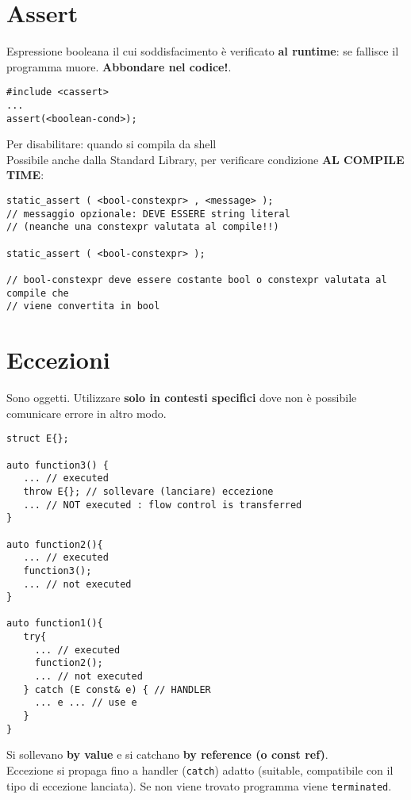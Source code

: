 \documentclass[10pt, oneside]{Book}
\begin{document}
\section{Assert}
Espressione booleana il cui soddisfacimento è verificato \textbf{al runtime}: se fallisce il programma muore. \textbf{Abbondare nel codice!}.
\begin{verbatim}
#include <cassert>
...
assert(<boolean-cond>);
\end{verbatim}
Per disabilitare: quando si compila da shell 
\\Possibile anche dalla Standard Library, per verificare condizione \textbf{AL COMPILE TIME}:
\begin{verbatim}
static_assert ( <bool-constexpr> , <message> );
// messaggio opzionale: DEVE ESSERE string literal
// (neanche una constexpr valutata al compile!!)

static_assert ( <bool-constexpr> );

// bool-constexpr deve essere costante bool o constexpr valutata al compile che
// viene convertita in bool
\end{verbatim}

\section{Eccezioni}
Sono oggetti. Utilizzare \textbf{solo in contesti specifici} dove non è possibile comunicare errore in altro modo.
\begin{verbatim}
struct E{};

auto function3() {
   ... // executed
   throw E{}; // sollevare (lanciare) eccezione
   ... // NOT executed : flow control is transferred
}

auto function2(){
   ... // executed
   function3();
   ... // not executed
}

auto function1(){
   try{
     ... // executed
     function2();
     ... // not executed
   } catch (E const& e) { // HANDLER
     ... e ... // use e
   }
}
\end{verbatim}
Si sollevano \textbf{by value} e si catchano \textbf{by reference (o const ref)}.
\\Eccezione si propaga fino a handler (\texttt{catch}) adatto (suitable, compatibile con il tipo di eccezione lanciata). Se non viene trovato programma viene \texttt{terminated}.
\end{document}
